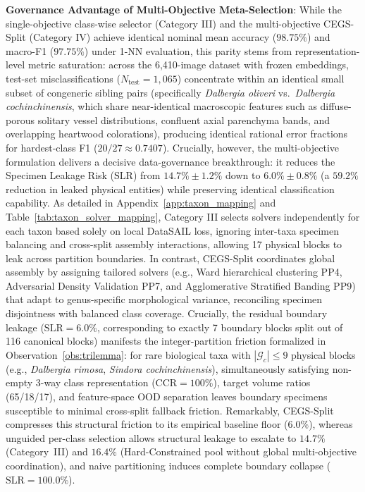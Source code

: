 \documentclass[a4paper,fleqn]{cas-sc}
\begin{document}
\textbf{Governance Advantage of Multi-Objective Meta-Selection}: While the single-objective class-wise selector (Category III) and the multi-objective CEGS-Split (Category IV) achieve identical nominal mean accuracy ($98.75\%$) and macro-F1 ($97.75\%$) under 1-NN evaluation, this parity stems from representation-level metric saturation: across the 6,410-image dataset with frozen embeddings, test-set misclassifications ($N_{\text{test}} = 1{,}065$) concentrate within an identical small subset of congeneric sibling pairs (specifically \textit{Dalbergia oliveri} vs.\ \textit{Dalbergia cochinchinensis}, which share near-identical macroscopic features such as diffuse-porous solitary vessel distributions, confluent axial parenchyma bands, and overlapping heartwood colorations), producing identical rational error fractions for hardest-class F1 ($20/27 \approx 0.7407$). Crucially, however, the multi-objective formulation delivers a decisive data-governance breakthrough: it reduces the Specimen Leakage Risk ($\mathrm{SLR}$) from $14.7\% \pm 1.2\%$ down to $6.0\% \pm 0.8\%$ (a $59.2\%$ reduction in leaked physical entities) while preserving identical classification capability. As detailed in Appendix~\ref{app:taxon_mapping} and Table~\ref{tab:taxon_solver_mapping}, Category III selects solvers independently for each taxon based solely on local DataSAIL loss, ignoring inter-taxa specimen balancing and cross-split assembly interactions, allowing 17 physical blocks to leak across partition boundaries. In contrast, CEGS-Split coordinates global assembly by assigning tailored solvers (e.g., Ward hierarchical clustering PP4, Adversarial Density Validation PP7, and Agglomerative Stratified Banding PP9) that adapt to genus-specific morphological variance, reconciling specimen disjointness with balanced class coverage. Crucially, the residual boundary leakage ($\mathrm{SLR} = 6.0\%$, corresponding to exactly 7 boundary blocks split out of 116 canonical blocks) manifests the integer-partition friction formalized in Observation~\ref{obs:trilemma}: for rare biological taxa with $|\mathcal{G}_c| \le 9$ physical blocks (e.g., \textit{Dalbergia rimosa}, \textit{Sindora cochinchinensis}), simultaneously satisfying non-empty 3-way class representation ($\mathrm{CCR}=100\%$), target volume ratios (65/18/17), and feature-space OOD separation leaves boundary specimens susceptible to minimal cross-split fallback friction. Remarkably, CEGS-Split compresses this structural friction to its empirical baseline floor ($6.0\%$), whereas unguided per-class selection allows structural leakage to escalate to $14.7\%$ (Category~III) and $16.4\%$ (Hard-Constrained pool without global multi-objective coordination), and naive partitioning induces complete boundary collapse ($\mathrm{SLR} = 100.0\%$).
\end{document}
